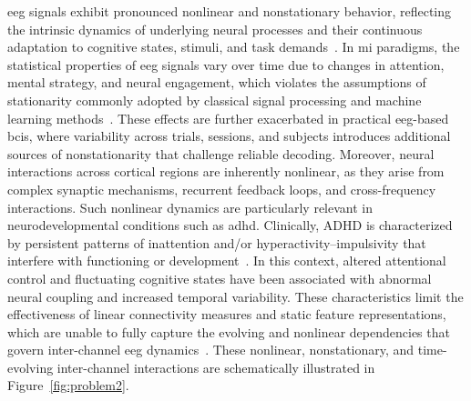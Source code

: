 \gls{eeg} signals exhibit pronounced nonlinear and nonstationary behavior, reflecting the intrinsic dynamics of underlying neural processes and their continuous adaptation to cognitive states, stimuli, and task demands~\cite{breakspear2017dynamic}. In \gls{mi} paradigms, the statistical properties of \gls{eeg} signals vary over time due to changes in attention, mental strategy, and neural engagement, which violates the assumptions of stationarity commonly adopted by classical signal processing and machine learning methods~\cite{shoka2019literature}. These effects are further exacerbated in practical \gls{eeg}-based \glspl{bci}, where variability across trials, sessions, and subjects introduces additional sources of nonstationarity that challenge reliable decoding. Moreover, neural interactions across cortical regions are inherently nonlinear, as they arise from complex synaptic mechanisms, recurrent feedback loops, and cross-frequency interactions. Such nonlinear dynamics are particularly relevant in neurodevelopmental conditions such as \gls{adhd}. {Clinically, ADHD is characterized by persistent patterns of inattention and/or hyperactivity--impulsivity that interfere with functioning or development~\cite{APA2022DSM5TR}.} In this context, altered
attentional control and fluctuating cognitive states have been associated with abnormal neural coupling and increased temporal variability. These characteristics limit the effectiveness of linear connectivity measures and static feature representations, which are unable to fully capture the evolving and nonlinear dependencies that govern inter-channel \gls{eeg} dynamics~\cite{rolls2022effective}. These nonlinear, nonstationary, and time-evolving inter-channel interactions are schematically illustrated in Figure~\ref{fig:problem2}.

